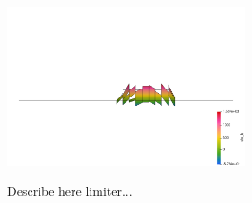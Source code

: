 \begin{center}
\includegraphics[width=7cm]{python_codes/fieldstone_41/results/exp3/eta_ls_warp2}\\
\end{center}

Describe here limiter...


